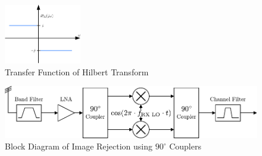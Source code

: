 \begin{figure}[h!]
  \centering
  \includegraphics[width=0.3\textwidth]{figures/hilbert}
  \caption{Transfer Function of Hilbert Transform}
  \label{fig:hilbert}
\end{figure}

\begin{figure}[h!]
  \centering
  \includegraphics[width=\textwidth]{figures/rx_rf_1_bd}
  \caption{Block Diagram of Image Rejection using $90^\circ$ Couplers}
  \label{fig:rx_rf_1_bd}
\end{figure}

